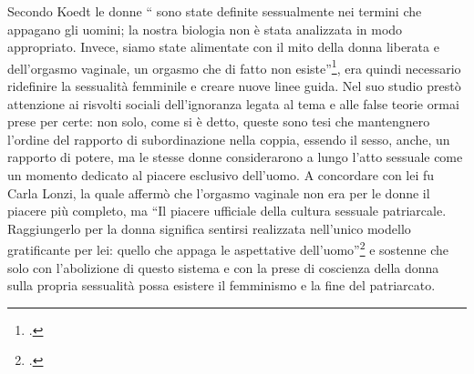 Secondo Koedt le donne \enquote{ sono state deﬁnite sessualmente nei termini che appagano gli uomini; la nostra biologia non è stata analizzata in modo appropriato. Invece, siamo state alimentate con il mito della donna liberata e dell'orgasmo vaginale, un orgasmo che di fatto non esiste}\footcite{Koedt}, era quindi necessario ridefinire la sessualità femminile e creare nuove linee guida.
Nel suo studio prestò attenzione ai risvolti sociali dell'ignoranza legata al tema e alle false teorie ormai prese per certe: non solo, come si è detto, queste sono tesi che mantengnero l'ordine del rapporto di subordinazione nella coppia, essendo il sesso, anche, un rapporto di potere, ma le stesse donne considerarono a lungo l'atto sessuale come un momento dedicato al piacere esclusivo dell'uomo.
A concordare con lei fu Carla Lonzi, la quale affermò che l'orgasmo vaginale non era per le donne il piacere più completo, ma \enquote{Il piacere ufficiale della cultura sessuale patriarcale. Raggiungerlo per la donna significa sentirsi realizzata nell’unico modello gratificante per lei: quello che appaga le aspettative dell’uomo}\footcite{Lonzi} e sostenne che solo con l'abolizione di questo sistema e con la prese di coscienza della donna sulla propria sessualità possa esistere il femminismo e la fine del patriarcato.


